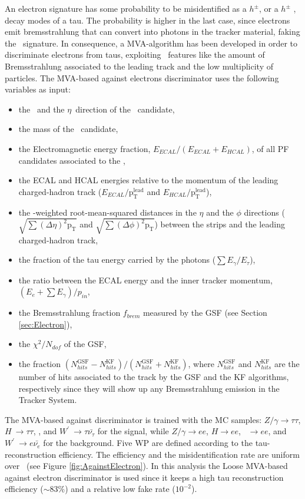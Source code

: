 \noindent An electron signature has some probability to be misidentified as 
a $h^{\pm}$, or a $h^{\pm}$ \picero, decay modes of a tau. The probability 
is higher in the last case, since electrons emit bremsstrahlung that
can convert into photons in the tracker material, faking the \picero~signature. In 
consequence, a MVA-algorithm has been developed in order to discriminate 
electrons from taus, exploiting \tauh~features like the amount of 
Bremsstrahlung associated to the leading track and the low 
multiplicity of particles. The MVA-based against electrons discriminator 
uses the following variables as input:
\begin{itemize}
 \item the \pt~and the $\eta$~direction of the \tauh~candidate,
 \item the mass of the \tauh~candidate,
 \item the Electromagnetic energy fraction, $E_{ECAL}/(E_{ECAL}+E_{HCAL})$, of all 
 PF candidates associated to the \tauh,
 \item the ECAL and HCAL energies relative to the momentum of the leading charged-hadron 
 track ($E_{ECAL}/\textrm{p}_{\textrm{T}}^{\textrm{lead}}$ and $E_{HCAL}/\textrm{p}_{\textrm{T}}^{\textrm{lead}}$),
 \item the \pt-weighted root-mean-squared distances in the $\eta$ and the $\phi$ directions 
 ($\sqrt{\sum(\Delta \eta)^{2}\textrm{p}_{\textrm{T}}}$ and 
 $\sqrt{\sum(\Delta \phi)^{2}\textrm{p}_{\textrm{T}}}$) between the strips and the leading 
 charged-hadron track,
 \item the fraction of the tau energy carried by the photons ($\sum E_{\gamma} / E_{\tau}$),
 \item the ratio between the ECAL energy and the inner tracker momentum, $(E_{e}+\sum E_{\gamma})/p_{in}$,
 \item the Bremsstrahlung fraction $f_{brem}$ measured by the GSF (see Section \ref{sec:Electron}),
 \item the $\chi^{2}/N_{dof}$ of the GSF,
 \item the fraction $(N_{hits}^{\textrm{GSF}}-N_{hits}^{\textrm{KF}})/(N_{hits}^{\textrm{GSF}}+N_{hits}^{\textrm{KF}})$, where
 $N_{hits}^{\textrm{GSF}}$ and $N_{hits}^{\textrm{KF}}$ are the number of hits associated to the track by the GSF and the KF algorithms,
 respectively since they will show up any Bremsstrahlung emission in the Tracker System. 
\end{itemize}
 
\noindent The MVA-based against discriminator is trained with the MC samples: 
$Z/\gamma \rightarrow \tau\tau$, $H~\rightarrow \tau\tau$, \Zprimetotautau, and $W^{\prime}~
\rightarrow \tau\bar{\nu_{\tau}}$ for the signal, while
$Z/\gamma \rightarrow ee$, $H \rightarrow ee$, \Zprime~$\rightarrow ee$, and $W^{\prime}~
\rightarrow e\bar{\nu_{e}}$ for the background. Five WP are defined according to the 
tau-reconstruction efficiency. The efficiency and the misidentification rate are uniform over 
\pt~(see Figure \ref{fig:AgainstElectron}). In this 
analysis the Loose MVA-based against electron discriminator is used 
since it keeps a high tau reconstruction efficiency ($\sim$83$\%$) and a relative 
low fake rate ($10 ^{-2}$).

